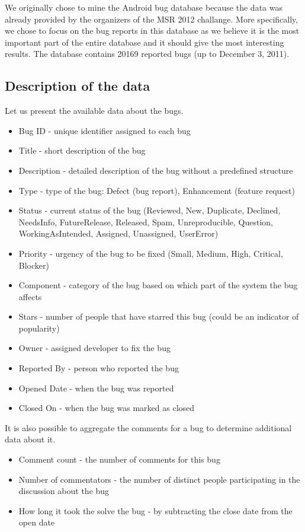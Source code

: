 
We originally chose to mine the Android bug database because the data was already provided by the organizers of the MSR 2012 challange. More specifically, we chose to focus on the bug reports in this database as we believe it is the most important part of the entire database and it should give the most interesting results. The database contains 20169 reported bugs (up to December 3, 2011). 

\subsection*{Description of the data} %
\label{sub:Description of the data}

Let us present the available data about the bugs.

\begin{itemize}
\item Bug ID - unique identifier assigned to each bug
\item Title - short description of the bug
\item Description - detailed description of the bug without a predefined structure
\item Type - type of the bug: Defect (bug report), Enhancement (feature request)
\item Status - current status of the bug (Reviewed, New, Duplicate, Declined, NeedsInfo, FutureRelease, Released, Spam, Unreproducible, Question, WorkingAsIntended, Assigned, Unassigned, UserError)
\item Priority - urgency of the bug to be fixed (Small, Medium, High, Critical, Blocker)
\item Component - category of the bug based on which part of the system the bug affects
\item Stars - number of people that have starred this bug (could be an indicator of popularity)
\item Owner - assigned developer to fix  the bug
\item Reported By - person who reported the bug
\item Opened Date - when the bug was reported
\item Closed On - when the bug was marked as closed
\end{itemize}

It is also possible to aggregate the comments for a bug to determine additional data about it.

\begin{itemize}
\item Comment count - the number of comments for this bug
\item Number of commentators - the number of distinct people participating in the discussion about the bug
\item How long it took the solve the bug - by subtracting the close date from the open date
\end{itemize}

